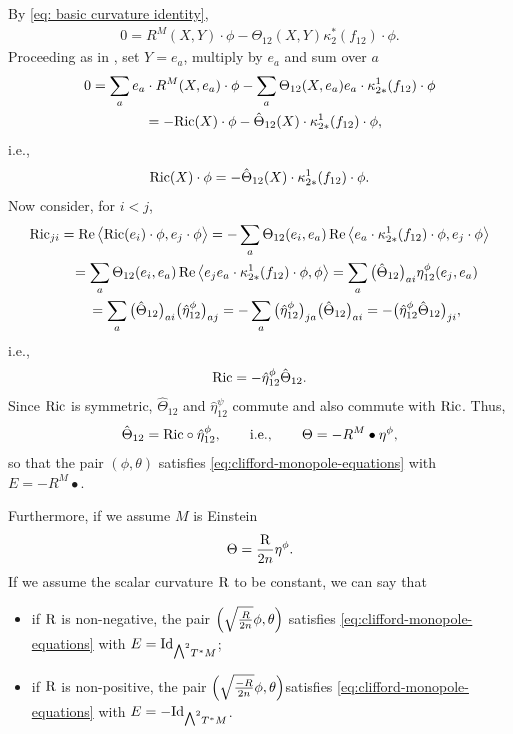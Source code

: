 \documentclass[10pt,a4paper]{amsart}
\newcommand{\ext}{\raise1pt\hbox{\small$\bigwedge$}}
\numberwithin{equation}{section}
\begin{document}
By \eqref{eq: basic curvature identity},
\begin{gather*}
0 = R^M(X,Y)\cdot \phi - \Theta_{12}(X,Y)\kappa_{2}^*(f_{12})\cdot \phi.
\end{gather*}
Proceeding as in \cite{Friedrich}, set $Y=e_a$, multiply by $e_a$ and sum over $a$
\begin{gather*}
0 = \sum_a e_a\cdot R^M(X,e_a)\cdot \phi - \sum_a \Theta_{12}(X,e_a)e_a\cdot\kappa_{2*}^1(f_{12})\cdot \phi\\
\hphantom{0}{}= -{\rm Ric}(X)\cdot \phi -\hat\Theta_{12}(X)\cdot \kappa_{2*}^1(f_{12})\cdot \phi,
\end{gather*}
i.e.,
\begin{gather*}
{\rm Ric}(X)\cdot \phi = -\hat\Theta_{12}(X)\cdot \kappa_{2*}^1(f_{12})\cdot \phi.
\end{gather*}
Now consider, for $i<j$,
\begin{gather*}
{\rm Ric}_{ji} =\operatorname{Re}\big\langle {\rm Ric}(e_i)\cdot \phi , e_j \cdot \phi\big\rangle =
 -\sum_a \Theta_{12}(e_i,e_a) \operatorname{Re}\big\langle e_a \cdot\kappa_{2*}^1(f_{12})\cdot \phi, e_j\cdot \phi\big\rangle \\
\hphantom{{\rm Ric}_{ji}}{} =
 \sum_a \Theta_{12}(e_i,e_a) \operatorname{Re}\big\langle e_je_a \cdot\kappa_{2*}^1(f_{12})\cdot \phi, \phi\big\rangle
 = \sum_a \big(\hat\Theta_{12}\big)_{ai} \eta_{12}^\phi(e_j,e_a) \\
\hphantom{{\rm Ric}_{ji}}{}
 = \sum_a \big(\hat\Theta_{12}\big)_{ai} \big(\hat\eta_{12}^\phi\big)_{aj} =- \sum_a \big(\hat\eta_{12}^\phi\big)_{ja}\big(\hat\Theta_{12}\big)_{ai} = - \big(\hat\eta_{12}^\phi\hat\Theta_{12}\big)_{ji} ,
\end{gather*}
i.e.,
\begin{gather*}
{\rm Ric} = -\hat\eta_{12}^\phi\hat\Theta_{12}.
\end{gather*}
Since ${\rm Ric}$ is symmetric, $\hat\Theta_{12}$ and $\hat\eta_{12}^\psi$ commute and also commute with ${\rm Ric}$.
Thus,
\begin{gather*}\hat\Theta_{12}= {\rm Ric}\circ\hat\eta_{12}^\phi,\qquad \text{i.e.},
\qquad \Theta= -R^M\bullet\eta^\phi,\end{gather*}
so that the pair $(\phi,\theta)$ satisfies \eqref{eq:clifford-monopole-equations} with $E=-R^M\bullet$.

Furthermore, if we assume $M$ is Einstein
\begin{gather*}
\Theta ={{\rm R}\over 2n}\eta^\phi.
\end{gather*}
If we assume the scalar curvature ${\rm R}$ to be constant, we can say that
\begin{itemize}\itemsep=0pt
\item if ${\rm R}$ is non-negative, the pair $\Big(\sqrt{{R\over 2n}}\phi, \theta\Big)$ satisfies \eqref{eq:clifford-monopole-equations} with $E={\rm Id}_{\ext^2T^*M}$;
\item if ${\rm R}$ is non-positive, the pair $\Big(\sqrt{{-R\over 2n}}\phi, \theta\Big)$satisfies \eqref{eq:clifford-monopole-equations} with $E=-{\rm Id}_{\ext^2T^*M}$.
\end{itemize}
\end{document}
